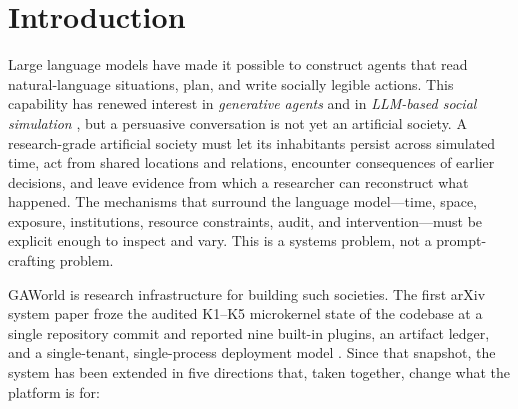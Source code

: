 \section{Introduction}
\label{sec:introduction}

Large language models have made it possible to construct agents that read
natural-language situations, plan, and write socially legible actions.  This
capability has renewed interest in \emph{generative agents} and in
\emph{LLM-based social simulation}
\citep{park2023generative,park2024grounded,argyle2023outofone}, but a
persuasive conversation is not yet an artificial society.  A research-grade
artificial society must let its inhabitants persist across simulated time, act
from shared locations and relations, encounter consequences of earlier
decisions, and leave evidence from which a researcher can reconstruct what
happened.  The mechanisms that surround the language model---time, space,
exposure, institutions, resource constraints, audit, and intervention---must
be explicit enough to inspect and vary.  This is a systems problem, not a
prompt-crafting problem.

GAWorld is research infrastructure for building such societies.  The first
arXiv system paper froze the audited K1--K5 microkernel state of the codebase
at a single repository commit and reported nine built-in plugins, an artifact
ledger, and a single-tenant, single-process deployment model
\citep{gawoerldv1}.  Since that snapshot, the system has been extended in five
directions that, taken together, change what the platform is for:

